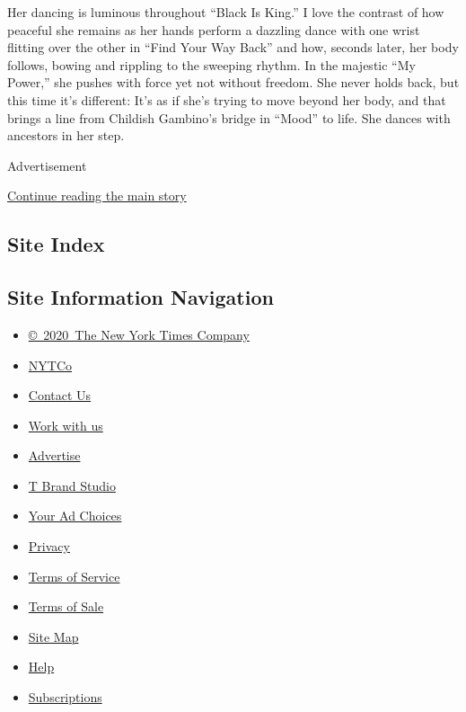 Her dancing is luminous throughout ``Black Is King.'' I love the
contrast of how peaceful she remains as her hands perform a dazzling
dance with one wrist flitting over the other in ``Find Your Way Back''
and how, seconds later, her body follows, bowing and rippling to the
sweeping rhythm. In the majestic ``My Power,'' she pushes with force yet
not without freedom. She never holds back, but this time it's different:
It's as if she's trying to move beyond her body, and that brings a line
from Childish Gambino's bridge in ``Mood'' to life. She dances with
ancestors in her step.

Advertisement

\protect\hyperlink{after-bottom}{Continue reading the main story}

\hypertarget{site-index}{%
\subsection{Site Index}\label{site-index}}

\hypertarget{site-information-navigation}{%
\subsection{Site Information
Navigation}\label{site-information-navigation}}

\begin{itemize}
\tightlist
\item
  \href{https://help.nytimes.com/hc/en-us/articles/115014792127-Copyright-notice}{©~2020~The
  New York Times Company}
\end{itemize}

\begin{itemize}
\tightlist
\item
  \href{https://www.nytco.com/}{NYTCo}
\item
  \href{https://help.nytimes.com/hc/en-us/articles/115015385887-Contact-Us}{Contact
  Us}
\item
  \href{https://www.nytco.com/careers/}{Work with us}
\item
  \href{https://nytmediakit.com/}{Advertise}
\item
  \href{http://www.tbrandstudio.com/}{T Brand Studio}
\item
  \href{https://www.nytimes.com/privacy/cookie-policy\#how-do-i-manage-trackers}{Your
  Ad Choices}
\item
  \href{https://www.nytimes.com/privacy}{Privacy}
\item
  \href{https://help.nytimes.com/hc/en-us/articles/115014893428-Terms-of-service}{Terms
  of Service}
\item
  \href{https://help.nytimes.com/hc/en-us/articles/115014893968-Terms-of-sale}{Terms
  of Sale}
\item
  \href{https://spiderbites.nytimes.com}{Site Map}
\item
  \href{https://help.nytimes.com/hc/en-us}{Help}
\item
  \href{https://www.nytimes.com/subscription?campaignId=37WXW}{Subscriptions}
\end{itemize}
